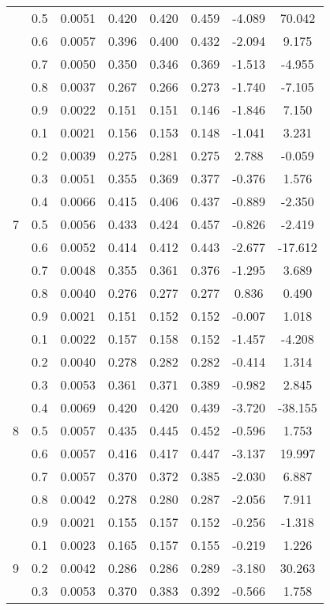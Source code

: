 \documentclass[11pt,a4paper]{report}
\begin{document}
\begin{longtable}{ | c | c || c | c | c | c | c | c | }
 & 0.5 & 0.0051 & 0.420 & 0.420 & 0.459 & -4.089 & 70.042 \\
 & 0.6 & 0.0057 & 0.396 & 0.400 & 0.432 & -2.094 & 9.175 \\
 & 0.7 & 0.0050 & 0.350 & 0.346 & 0.369 & -1.513 & -4.955 \\
 & 0.8 & 0.0037 & 0.267 & 0.266 & 0.273 & -1.740 & -7.105 \\
 & 0.9 & 0.0022 & 0.151 & 0.151 & 0.146 & -1.846 & 7.150 \\
 \hline
\multirow{9}{*}{7} & 0.1 & 0.0021 & 0.156 & 0.153 & 0.148 & -1.041 & 3.231 \\
 & 0.2 & 0.0039 & 0.275 & 0.281 & 0.275 & 2.788 & -0.059 \\
 & 0.3 & 0.0051 & 0.355 & 0.369 & 0.377 & -0.376 & 1.576 \\
 & 0.4 & 0.0066 & 0.415 & 0.406 & 0.437 & -0.889 & -2.350 \\
 & 0.5 & 0.0056 & 0.433 & 0.424 & 0.457 & -0.826 & -2.419 \\
 & 0.6 & 0.0052 & 0.414 & 0.412 & 0.443 & -2.677 & -17.612 \\
 & 0.7 & 0.0048 & 0.355 & 0.361 & 0.376 & -1.295 & 3.689 \\
 & 0.8 & 0.0040 & 0.276 & 0.277 & 0.277 & 0.836 & 0.490 \\
 & 0.9 & 0.0021 & 0.151 & 0.152 & 0.152 & -0.007 & 1.018 \\
 \hline
\multirow{9}{*}{8} & 0.1 & 0.0022 & 0.157 & 0.158 & 0.152 & -1.457 & -4.208 \\
 & 0.2 & 0.0040 & 0.278 & 0.282 & 0.282 & -0.414 & 1.314 \\
 & 0.3 & 0.0053 & 0.361 & 0.371 & 0.389 & -0.982 & 2.845 \\
 & 0.4 & 0.0069 & 0.420 & 0.420 & 0.439 & -3.720 & -38.155 \\
 & 0.5 & 0.0057 & 0.435 & 0.445 & 0.452 & -0.596 & 1.753 \\
 & 0.6 & 0.0057 & 0.416 & 0.417 & 0.447 & -3.137 & 19.997 \\
 & 0.7 & 0.0057 & 0.370 & 0.372 & 0.385 & -2.030 & 6.887 \\
 & 0.8 & 0.0042 & 0.278 & 0.280 & 0.287 & -2.056 & 7.911 \\
 & 0.9 & 0.0021 & 0.155 & 0.157 & 0.152 & -0.256 & -1.318 \\
 \hline
\multirow{9}{*}{9} & 0.1 & 0.0023 & 0.165 & 0.157 & 0.155 & -0.219 & 1.226 \\
 & 0.2 & 0.0042 & 0.286 & 0.286 & 0.289 & -3.180 & 30.263 \\
 & 0.3 & 0.0053 & 0.370 & 0.383 & 0.392 & -0.566 & 1.758 \\

\end{longtable}
\end{document}

